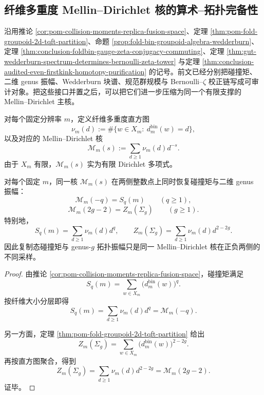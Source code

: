 \subsection{纤维多重度 Mellin--Dirichlet 核的算术--拓扑完备性}\label{subsec:conclusion-foldbin-multiplicity-mellin-dirichlet-kernel}
沿用推论 \ref{cor:pom-collision-moments-replica-fusion-space}、定理 \ref{thm:pom-fold-groupoid-2d-tqft-partition}、命题 \ref{prop:fold-bin-groupoid-algebra-wedderburn}、定理 \ref{thm:conclusion-foldbin-gauge-zeta-conjugacy-commuting}、定理 \ref{thm:gut-wedderburn-spectrum-determines-bernoulli-zeta-tower} 与定理 \ref{thm:conclusion-audited-even-firstkink-homotopy-purification} 的记号。前文已经分别把碰撞矩、二维 genus 振幅、Wedderburn 块谱、规范群规模与 Bernoulli--\(\zeta\) 校正链写成可审计对象。把这些接口并置之后，可以把它们进一步压缩为同一个有限支撑的 Mellin--Dirichlet 主核。

对每个固定分辨率 \(m\)，定义纤维多重度直方图
\[
\nu_m(d):=\#\{w\in X_m:\ d_m^{\mathrm{bin}}(w)=d\},
\]
以及对应的 Mellin--Dirichlet 核
\[
\mathcal M_m(s):=\sum_{d\ge 1}\nu_m(d)d^{-s}.
\]
由于 \(X_m\) 有限，\(\mathcal M_m(s)\) 实为有限 Dirichlet 多项式。

\begin{theorem}\label{thm:conclusion-foldbin-multiplicity-mellin-two-sided-unification}
对每个固定 \(m\)，同一核 \(\mathcal M_m(s)\) 在两侧整数点上同时恢复碰撞矩与二维 genus 振幅：
\[
\mathcal M_m(-q)=S_q(m)
\qquad(q\ge 1),
\]
\[
\mathcal M_m(2g-2)=Z_m(\Sigma_g)
\qquad(g\ge 1).
\]
特别地，
\[
S_q(m)=\sum_{d\ge 1}\nu_m(d)d^q,
\qquad
Z_m(\Sigma_g)=\sum_{d\ge 1}\nu_m(d)d^{2-2g}.
\]
因此复制态碰撞矩与 genus-\(g\) 拓扑振幅只是同一 Mellin--Dirichlet 核在正负两侧的不同采样。
\end{theorem}
\begin{proof}
由推论 \ref{cor:pom-collision-moments-replica-fusion-space}，碰撞矩满足
\[
S_q(m)=\sum_{w\in X_m}\bigl(d_m^{\mathrm{bin}}(w)\bigr)^q.
\]
按纤维大小分层即得
\[
S_q(m)=\sum_{d\ge 1}\nu_m(d)d^q=\mathcal M_m(-q).
\]

另一方面，定理 \ref{thm:pom-fold-groupoid-2d-tqft-partition} 给出
\[
Z_m(\Sigma_g)=\sum_{w\in X_m}\bigl(d_m^{\mathrm{bin}}(w)\bigr)^{2-2g}.
\]
再按直方图聚合，得到
\[
Z_m(\Sigma_g)=\sum_{d\ge 1}\nu_m(d)d^{2-2g}=\mathcal M_m(2g-2).
\]
证毕。
\end{proof}

